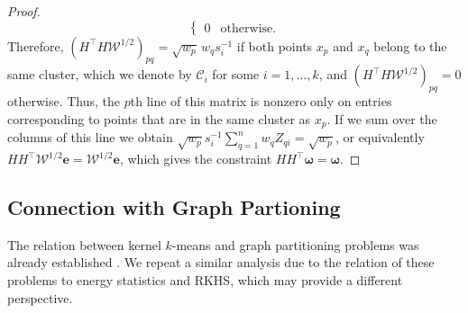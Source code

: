\documentclass[aps,preprint,nofootinbib,floatfix]{revtex4-1}
\newcommand\C{{\mathcal{C}}}
\begin{document}
\begin{proof}
\begin{equation}
\begin{cases}
0 & \mbox{otherwise}.
\end{cases}
\end{equation}
Therefore, $(H^\top H \mathcal{W}^{1/2})_{pq} = \sqrt{w_p} \, w_q s_i^{-1}$
if both points $x_p$ and $x_q$ belong to the same cluster, which
we denote by $\C_i$ for some $i=1,\dotsc,k$, and 
$(H^\top H \mathcal{W}^{1/2})_{pq} = 0 $ otherwise. Thus, the $p$th
line of this matrix is nonzero only on entries corresponding to points
that are in the same cluster as $x_p$. If we sum over the columns of this
line we obtain $\sqrt{w_p} s_i^{-1} \sum_{q=1}^n w_q Z_{qi} = \sqrt{w_p}$,
or equivalently $H H^\top \mathcal{W}^{1/2} \bm{e} = \mathcal{W}^{1/2} \bm{e}$,
which gives the constraint $H H^\top \bm{\omega} = \bm{\omega}$.
\end{proof}


\subsection{Connection with Graph Partioning}

The relation between kernel $k$-means and graph partitioning problems
was already established \cite{Dhillon}. We repeat a similar analysis
due to the relation of these problems to
energy statistics and RKHS, which may provide a different perspective.
\end{document}
